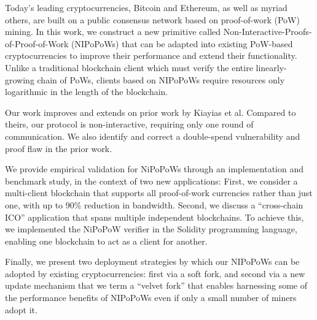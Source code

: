 Today's leading cryptocurrencies, Bitcoin and Ethereum, as well as myriad others, are built on a public consensus network based on proof-of-work (PoW) mining. In this work, we construct a new primitive called Non-Interactive-Proofs-of-Proof-of-Work (NIPoPoWs) that can be adapted into existing PoW-based cryptocurrencies to improve their performance and extend their functionality.
Unlike a traditional blockchain client
which must verify the entire linearly-growing chain of PoWs, clients based on
NIPoPoWs require resources only logarithmic in the length of the blockchain.

Our work improves and extends on prior work by Kiayias et al. Compared to theirs, our protocol is non-interactive, requiring only one round of communication. We also identify and correct a double-spend vulnerability and proof flaw in the prior work. %

We provide empirical validation for NiPoPoWs through an implementation and benchmark study, in the context of two new applications:
First, we consider a multi-client blockchain that supports all proof-of-work currencies rather than just one, with up to 90\% reduction in bandwidth. 
Second, we discuss a ``cross-chain ICO'' application that spans multiple independent blockchains. To achieve this, we implemented the NiPoPoW verifier in the Solidity programming language, enabling one blockchain to act as a client for another.

Finally, we present two deployment strategies by which our NIPoPoWs can be adopted by existing cryptocurrencies: first via a soft fork, and second via a new update mechanism that we
term a ``velvet fork'' that enables harnessing some of the performance benefits
of NIPoPoWs even if only a small number of miners adopt it.
